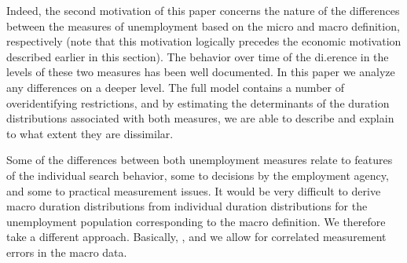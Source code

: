 \documentclass[12pt]{article}
\newcommand{\CiteReference}{../reference.bib}
\newcommand{\highlightP}[1]{{\emph{\color{MyPink}{#1}}}}
\theoremstyle{definition}
\begin{document}
Indeed, the second motivation of this paper concerns the nature of the differences between the measures of unemployment based on the micro and macro definition, respectively (note that this motivation logically precedes the economic motivation described earlier in this section). The behavior over time of the di.erence in the levels of these two measures has been well documented. In this paper we analyze any differences on a deeper level. The full model contains a number of overidentifying restrictions, and by estimating the determinants of the duration distributions associated with both measures, we are able to describe and explain to what extent they are dissimilar. 

Some of the differences between both unemployment measures relate to features of the individual search behavior, some to decisions by the employment agency, and some to practical measurement issues. It would be very difficult to derive macro duration distributions from individual duration distributions for the unemployment population corresponding to the macro definition. We therefore take a different approach. Basically, \highlightP{we take the observed macro exit probabilities to be equal to a perturbed version of the probabilities that would prevail if the macro definition would be the same as the micro definition}, and we allow for correlated measurement errors in the macro data. 










 
\end{document}
